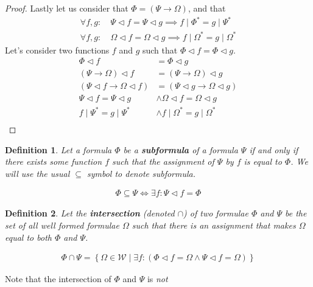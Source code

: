 \documentclass{article}
\newtheorem{defin}{Definition}
\begin{document}
\begin{proof}
Lastly let us consider that $\Phi = (\Psi\rightarrow\Omega)$, and that
\begin{align*}
\forall f,g: & \: \Psi   \lhd f = \Psi   \lhd g \implies f\mid\Phi^\ast  =g\mid\Psi^\ast   \\
\forall f,g: & \: \Omega \lhd f = \Omega \lhd g \implies f\mid\Omega^\ast=g\mid\Omega^\ast
\end{align*}
Let's consider two functions $f$ and $g$ such that $\Phi\lhd f=\Phi\lhd g$.
\begin{align*}
\Phi\lhd f                          &= \Phi\lhd g                              \\
(\Psi\rightarrow\Omega)\lhd f       &= (\Psi\rightarrow\Omega)\lhd g           \\
(\Psi\lhd f\rightarrow\Omega\lhd f) &= (\Psi\lhd g\rightarrow\Omega\lhd g)     \\
\Psi\lhd f = \Psi\lhd g             &\land \Omega\lhd f = \Omega\lhd g         \\
f\mid\Psi^\ast = g\mid\Psi^\ast     &\land f\mid\Omega^\ast = g\mid\Omega^\ast \\
\end{align*}

\end{proof}

\begin{defin}
Let a formula $\Phi$ be a \textbf{subformula} of a formula $\Psi$
if and only if there exists some function $f$ such that the assignment of $\Psi$ by $f$ is equal to $\Phi$.
We will use the usual $\subseteq$ symbol to denote subformula.

\begin{align*}
\Phi \subseteq \Psi \iff \exists f: \Psi \lhd f = \Phi
\end{align*}
\end{defin}

\begin{defin}
Let the \textbf{intersection} (denoted $\cap$) of two formulae $\Phi$ and $\Psi$ be
the set of all well formed formulae $\Omega$ such that there is an assignment that makes $\Omega$ equal to both $\Phi$ and $\Psi$.

\begin{align*}
\Phi \cap \Psi = \left\{\Omega \in \mathcal{W} \mid \exists f: (\Phi \lhd f = \Omega \land \Psi \lhd f = \Omega)\right\}
\end{align*}
\end{defin}

Note that the intersection of $\Phi$ and $\Psi$ is \textit{not}
\end{document}
